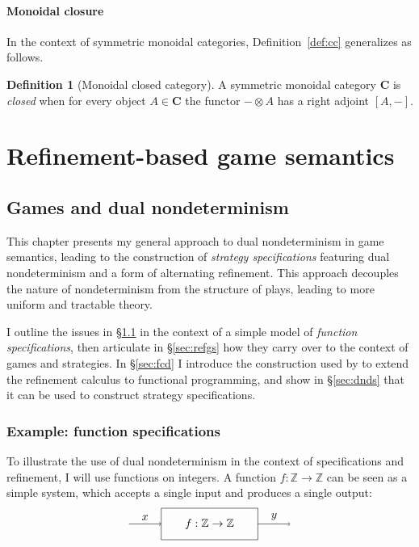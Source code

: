 \documentclass[11pt,oneside,draft]{book}
\theoremstyle{definition}
\newtheorem{definition}[theorem]{Definition}
\begin{document}
\subsection{Monoidal closure}

In the context of symmetric monoidal categories,
Definition~\ref{def:cc} generalizes as follows.

\begin{definition}[Monoidal closed category]
A symmetric monoidal category $\mathbf{C}$ is \emph{closed}
when for every object $A \in \mathbf{C}$
the functor ${-} \otimes A$
has a right adjoint $[A, {-}]$.
\end{definition}




\part{Refinement-based game semantics} \label{part:rbgs}

\chapter{Games and dual nondeterminism} \label{sec:games-dnd} %

This chapter presents my general approach
to dual nondeterminism in game semantics,
leading to the construction of \emph{strategy specifications}
featuring dual nondeterminism and a form of alternating refinement.
This approach decouples the nature of nondeterminism
from the structure of plays,
leading to more uniform and tractable theory.

I outline the issues in \S\ref{sec:fspec}
in the context of a simple model of \emph{function specifications},
then articulate in \S\ref{sec:refgs}
how they carry over to the context of games and strategies.
In \S\ref{sec:fcd} I introduce the construction used by \citet{augtyp}
to extend the refinement calculus to functional programming,
and show in \S\ref{sec:dnds} that it can be used
to construct strategy specifications.

\section{Example: function specifications} \label{sec:fspec} %

To illustrate the use of dual nondeterminism
in the context of specifications and refinement,
I will use functions on integers.
A function $f : \mathbb{Z} \rightarrow \mathbb{Z}$
can be seen as a simple system,
which accepts a single input and produces a single output:
\[
  \begin{tikzpicture}[scale=0.5]
    \draw (-3, -1) rectangle (3, 1);
    \node at (0,0) {$f : \mathbb{Z} \rightarrow \mathbb{Z}$};
    \draw[->] (-5,0) -- node[above] {$x$} (-3,0);
    \draw[->] (3,0) -- node[above] {$y$} (5,0);
  \end{tikzpicture}
\]
\end{document}
